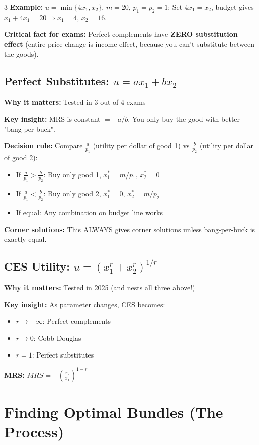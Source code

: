 \documentclass[10pt,landscape]{article}
\begin{document}
\begin{multicols}{3}
\textbf{Example:} $u = \min\{4x_1, x_2\}$, $m=20$, $p_1=p_2=1$: Set $4x_1 = x_2$, budget gives $x_1 + 4x_1 = 20 \Rightarrow x_1 = 4$, $x_2 = 16$.

\textbf{Critical fact for exams:} Perfect complements have \textbf{ZERO substitution effect} (entire price change is income effect, because you can't substitute between the goods).

\subsection{Perfect Substitutes: $u = ax_1 + bx_2$}
\textbf{Why it matters:} Tested in 3 out of 4 exams

\textbf{Key insight:} MRS is constant $= -a/b$. You only buy the good with better "bang-per-buck".

\textbf{Decision rule:} Compare $\frac{a}{p_1}$ (utility per dollar of good 1) vs $\frac{b}{p_2}$ (utility per dollar of good 2):
\begin{itemize}[leftmargin=*,noitemsep,topsep=0pt]
\item If $\frac{a}{p_1} > \frac{b}{p_2}$: Buy only good 1, $x_1^* = m/p_1$, $x_2^* = 0$
\item If $\frac{a}{p_1} < \frac{b}{p_2}$: Buy only good 2, $x_1^* = 0$, $x_2^* = m/p_2$
\item If equal: Any combination on budget line works
\end{itemize}

\textbf{Corner solutions:} This ALWAYS gives corner solutions unless bang-per-buck is exactly equal.

\subsection{CES Utility: $u = (x_1^r + x_2^r)^{1/r}$}
\textbf{Why it matters:} Tested in 2025 (and nests all three above!)

\textbf{Key insight:} As parameter changes, CES becomes:
\begin{itemize}[leftmargin=*,noitemsep,topsep=0pt]
\item $r \to -\infty$: Perfect complements
\item $r \to 0$: Cobb-Douglas
\item $r = 1$: Perfect substitutes
\end{itemize}

\textbf{MRS:} $MRS = -\left(\frac{x_2}{x_1}\right)^{1-r}$

\section{Finding Optimal Bundles (The Process)}


\end{multicols}
\end{document}
